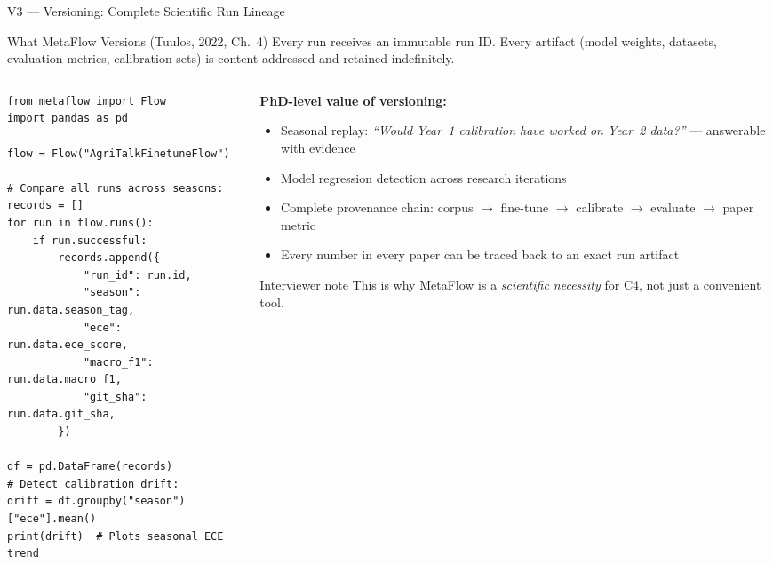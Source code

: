 \documentclass[10pt,aspectratio=169]{beamer}
\begin{document}
\begin{frame}[fragile]{V3 --- Versioning: Complete Scientific Run Lineage}

\begin{block}{What MetaFlow Versions (Tuulos, 2022, Ch.\ 4)}
\small Every run receives an immutable run ID. Every artifact (model weights, datasets, evaluation
metrics, calibration sets) is content-addressed and retained indefinitely.
\end{block}

\begin{columns}
\begin{column}{0.54\textwidth}
\begin{lstlisting}[title={\scriptsize Seasonal regression detection}]
from metaflow import Flow
import pandas as pd

flow = Flow("AgriTalkFinetuneFlow")

# Compare all runs across seasons:
records = []
for run in flow.runs():
    if run.successful:
        records.append({
            "run_id": run.id,
            "season": run.data.season_tag,
            "ece": run.data.ece_score,
            "macro_f1": run.data.macro_f1,
            "git_sha": run.data.git_sha,
        })

df = pd.DataFrame(records)
# Detect calibration drift:
drift = df.groupby("season")["ece"].mean()
print(drift)  # Plots seasonal ECE trend
\end{lstlisting}
\end{column}
\begin{column}{0.43\textwidth}
\small
\textbf{PhD-level value of versioning:}
\begin{itemize}
  \item Seasonal replay: \emph{``Would Year~1 calibration have worked on Year~2 data?''} --- answerable with evidence
  \item Model regression detection across research iterations
  \item Complete provenance chain: corpus $\to$ fine-tune $\to$ calibrate $\to$ evaluate $\to$ paper metric
  \item Every number in every paper can be traced back to an exact run artifact
\end{itemize}

\vspace{0.2cm}
\begin{alertblock}{Interviewer note}
\small This is why MetaFlow is a \emph{scientific necessity} for C4, not just a convenient tool.
\end{alertblock}
\end{column}
\end{columns}

\end{frame}
\end{document}
